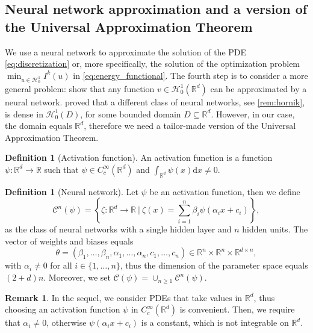 \documentclass[11pt,a4paper,reqno]{amsart}
\numberwithin{equation}{section}
\theoremstyle{plain}
\theoremstyle{definition}
\newtheorem{definition}[theorem]{Definition}
\newtheorem{remark}[theorem]{Remark}
\def\ud{\mathrm d}
\newcommand{\cH}{\mathcal{H}}
\newcommand{\R}{\mathbb{R}}
\begin{document}

\subsection{Neural network approximation and a version of the Universal Approximation Theorem}
\label{sec:neural}

We use a neural network to approximate the solution of the PDE \eqref{eq:discretization} or, more specifically, the solution of the optimization problem $\min_{u\in\mathcal{H}^1_0} I^k(u)$ in \eqref{eq:energy_functional}. 
The fourth step is to consider a more general problem: show that any function $v \in \cH_0^1 (\R^d)$ can be approximated by a neural network. 
\citet{hornik1991approximation} proved that a different class of neural networks, see \cref{rem:hornik}, is dense in $\cH_0^1 \left( D\right)$, for some bounded domain $D\subseteq\R^d$. 
However, in our case, the domain equals $\R^d$, therefore we need a tailor-made version of the Universal Approximation Theorem. 

\begin{definition}[Activation function]
\label{def:activation function}
An activation function is a function $\psi: \mathbb{R}^d \to \mathbb{R}$ such that $\psi \in C_c^\infty (\R^d)$ and $\int_{\R^d}\psi (x) \ud x \ne 0$.
\end{definition}

\begin{definition}[Neural network]
\label{def:NN}
Let $\psi$ be an activation function, then we define
\[
    \mathcal{C}^n \left(\psi\right) = \left\{ \zeta: \mathbb{R}^d \to \mathbb{R} \ \big| \ \zeta (x) = \sum_{i = 1}^n \beta_i \psi ( \alpha_i x + c_i ) \right\}, 
\]
as the class of neural networks with a single hidden layer and $n$ hidden units. 
The vector of weights and biases equals
\[
\theta = \left( \beta_1, \dots, \beta_n, \alpha_1, \dots, \alpha_n, c_1, \dots, c_n \right) \in \mathbb{R}^n \times \R^n \times \R^{d \times n},
\]
with $\alpha_i \ne 0$ for all $i\in\{1,\dots,n\}$, thus the dimension of the parameter space equals $\left(2+d\right)n$. 
Moreover, we set $\mathcal{C} \left( \psi \right) = \cup_{n \ge 1} \mathcal{C}^n \left( \psi \right)$. 
\end{definition}

\begin{remark}
In the sequel, we consider PDEs that take values in $\R^d$, thus choosing an activation function $\psi$ in $C_c^\infty (\R^d)$ is convenient. 
Then, we require that $\alpha_i \ne 0$, otherwise $\psi \left( \alpha_ix + c_i \right)$ is a constant, which is not integrable on $\R^d$.
\end{remark}
\end{document}
